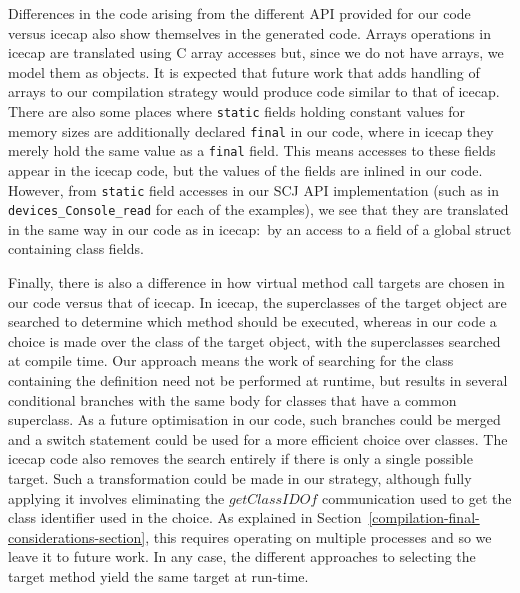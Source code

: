 {Differences in the code arising from the different API provided for
our code versus icecap also show themselves in the generated code.
Arrays operations in icecap are translated using C array accesses but,
since we do not have arrays, we model them as objects.
It is expected that future work that adds handling of arrays to our
compilation strategy would produce code similar to that of icecap.
There are also some places where \texttt{static} fields holding
constant values for memory sizes are additionally declared
\texttt{final} in our code, where in icecap they merely hold the same
value as a \texttt{final} field.
This means accesses to these fields appear in the icecap code, but the
values of the fields are inlined in our code.
However, from \texttt{static} field accesses in our SCJ API
implementation (such as in \texttt{devices\_Console\_read} for each of
the examples), we see that they are translated in the same way in our
code as in icecap:~by an access to a field of a global struct
containing class fields.

Finally, there is also a difference in how virtual method call targets
are chosen in our code versus that of icecap.
In icecap, the superclasses of the target object are searched to
determine which method should be executed, whereas in our code a
choice is made over the class of the target object, with the
superclasses searched at compile time.
Our approach means the work of searching for the class containing the
definition need not be performed at runtime, but results in several
conditional branches with the same body for classes that have a common
superclass.
As a future optimisation in our code, such branches could be merged
and a switch statement could be used for a more efficient choice over
classes.
The icecap code also removes the search entirely if there is only a
single possible target.
Such a transformation could be made in our strategy, although fully
applying it involves eliminating the $getClassIDOf$ communication used
to get the class identifier used in the choice.
As explained in
Section~\ref{compilation-final-considerations-section}, this requires
operating on multiple processes and so we leave it to future work.
In any case, the different approaches to selecting the target method
yield the same target at run-time.

}
